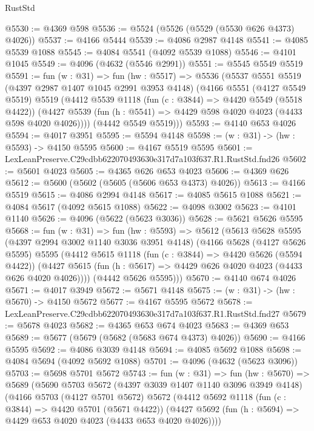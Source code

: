\begin{lexlean}{RustStd}
\begin{coremodule}
@5530 := @4369 @598
@5536 := @5524 (@5526 (@5529 (@5530 @626 @4373) @4026))
@5537 := @4166 @5444
@5539 := @4086 @2987 @4148
@5541 := @4085 @5539 @1088
@5545 := @4084 @5541 (@4092 @5539 @1088)
@5546 := @4101 @1045
@5549 := @4096 (@4632 (@5546 @2991))
@5551 := @5545 @5549 @5519
@5591 := fun (w : @31) =>
  fun (hw : @5517) =>
  @5536
    (@5537
      @5551
      @5519
      (@4397 @2987 @1407 @1045 @2991 @3953 @4148)
      (@4166
        @5551
        (@4127 @5549 @5519)
        @5519
        (@4412
          @5539
          @1118
          (fun (c : @3844) => @4420 @5549 (@5518 @4422))
          (@4427 @5539 (fun (h : @5541) => @4429 @598 @4020 @4023 (@4433 @598 @4020 @4026))))
        (@4442 @5549 @5519)))
@5593 := @4140 @653 @4026
@5594 := @4017 @3951
@5595 := @5594 @4148
@5598 := (w : @31) -> (hw : @5593) -> @4150 @5595
@5600 := @4167 @5519 @5595
@5601 := LexLeanPreserve.C29cdbb622070493630e317d7a103f637.R1.RustStd.fnd26
@5602 := @5601 @4023
@5605 := @4365 @626 @653 @4023
@5606 := @4369 @626
@5612 := @5600 (@5602 (@5605 (@5606 @653 @4373) @4026))
@5613 := @4166 @5519
@5615 := @4086 @2994 @4148
@5617 := @4085 @5615 @1088
@5621 := @4084 @5617 (@4092 @5615 @1088)
@5622 := @4098 @3002
@5623 := @4101 @1140
@5626 := @4096 (@5622 (@5623 @3036))
@5628 := @5621 @5626 @5595
@5668 := fun (w : @31) =>
  fun (hw : @5593) =>
  @5612
    (@5613
      @5628
      @5595
      (@4397 @2994 @3002 @1140 @3036 @3951 @4148)
      (@4166
        @5628
        (@4127 @5626 @5595)
        @5595
        (@4412
          @5615
          @1118
          (fun (c : @3844) => @4420 @5626 (@5594 @4422))
          (@4427 @5615 (fun (h : @5617) => @4429 @626 @4020 @4023 (@4433 @626 @4020 @4026))))
        (@4442 @5626 @5595)))
@5670 := @4140 @674 @4026
@5671 := @4017 @3949
@5672 := @5671 @4148
@5675 := (w : @31) -> (hw : @5670) -> @4150 @5672
@5677 := @4167 @5595 @5672
@5678 := LexLeanPreserve.C29cdbb622070493630e317d7a103f637.R1.RustStd.fnd27
@5679 := @5678 @4023
@5682 := @4365 @653 @674 @4023
@5683 := @4369 @653
@5689 := @5677 (@5679 (@5682 (@5683 @674 @4373) @4026))
@5690 := @4166 @5595
@5692 := @4086 @3039 @4148
@5694 := @4085 @5692 @1088
@5698 := @4084 @5694 (@4092 @5692 @1088)
@5701 := @4096 (@4632 (@5623 @3096))
@5703 := @5698 @5701 @5672
@5743 := fun (w : @31) =>
  fun (hw : @5670) =>
  @5689
    (@5690
      @5703
      @5672
      (@4397 @3039 @1407 @1140 @3096 @3949 @4148)
      (@4166
        @5703
        (@4127 @5701 @5672)
        @5672
        (@4412
          @5692
          @1118
          (fun (c : @3844) => @4420 @5701 (@5671 @4422))
          (@4427 @5692 (fun (h : @5694) => @4429 @653 @4020 @4023 (@4433 @653 @4020 @4026))))

\end{coremodule}
\end{lexlean}
